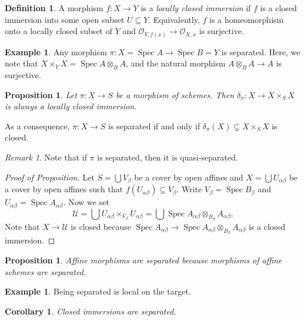 \documentclass[leqno, openany]{memoir}
\newtheorem{cor}[thm]{Corollary}
\newtheorem{prop}[thm]{Proposition}
\theoremstyle{definition}
\newtheorem{defn}[thm]{Definition}
\newtheorem{exm}[thm]{Example}
\theoremstyle{remark}
\newtheorem{rmk}[thm]{Remark}
\theoremstyle{plain}
\theoremstyle{definition}
\theoremstyle{remark}
\newcommand{\mc}[1]{\mathcal{#1}}
\DeclareMathOperator{\Spec}{Spec}
\begin{document}
\begin{defn}
    A morphism $f \colon X \to Y$ is a \textit{locally closed immersion} if $f$ is a closed immersion into some open subset $U \subseteq Y$. Equivalently, $f$ is a homeomorphism onto a locally closed subset of $Y$ and $\mc{O}_{Y, f(x)} \to \mc{O}_{X,x}$ is surjective.
\end{defn}

\begin{exm}
    Any morphism $\pi \colon X = \Spec A \to \Spec B = Y$ is separated. Here, we note that $X \times_Y X = \Spec A \otimes_B A$, and the natural morphism $A \otimes_B A \to A$ is surjective.
\end{exm}

\begin{prop}
    Let $\pi \colon X \to S$ be a morphism of schemes. Then $\delta_{\pi} \colon X \to X \times_S X$ is always a locally closed immersion.
\end{prop}

As a consequence, $\pi \colon X \to S$ is separated if and only if $\delta_{\pi}(X) \subseteq X \times_S X$ is closed.

\begin{rmk}
    Note that if $\pi$ is separated, then it is quasi-separated.
\end{rmk}

\begin{proof}[Proof of Proposition]
    Let $S = \bigcup V_{\beta}$ be a cover by open affines and $X = \bigcup U_{\alpha\beta}$ be a cover by open affines such that $f(U_{\alpha\beta}) \subseteq V_{\beta}$. Write $V_{\beta} = \Spec B_{\beta}$ and $U_{\alpha\beta} = \Spec A_{\alpha\beta}$. Now we set 
    \[ \mc{U} = \bigcup U_{\alpha\beta} \times_{V_{\beta}} U_{\alpha\beta} = \bigcup \Spec A_{\alpha\beta} \otimes_{B_{\beta}} A_{\alpha\beta}. \]
    Note that $X \to \mc{U}$ is closed because $\Spec A_{\alpha\beta} \to \Spec A_{\alpha\beta} \otimes_{B_{\beta}} A_{\alpha\beta}$ is a closed immersion.
\end{proof}

\begin{prop}
    Affine morphisms are separated because morphisms of affine schemes are separated.
\end{prop}

\begin{exm}
    Being separated is local on the target.
\end{exm}

\begin{cor}
    Closed immersions are separated.
\end{cor}
\end{document}
